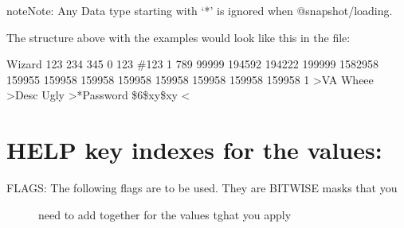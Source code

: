 \documentclass[letterpaper,10pt,english]{sphinxmanual}
\begin{document}
\begin{sphinxadmonition}{note}{Note:}
\sphinxAtStartPar
Any Data type starting with ‘*’ is ignored when @snapshot/loading.
\end{sphinxadmonition}

\sphinxAtStartPar
The structure above with the examples would look like this in the file:

Wizard
123
234
345
0
123
\#123
1
789
99999
194592
194222
199999
1582958
159955
159958
159958
159958
159958
159958
159958
159958
\sphinxhyphen{}1
\textgreater{}VA
Wheee
\textgreater{}Desc
Ugly
\textgreater{}*Password
\$6\$xy\$xy
\textless{}


\section{HELP key indexes for the values:}
\label{\detokenize{advanced:help-key-indexes-for-the-values}}\begin{description}
\item[{FLAGS: The following flags are to be used.  They are BITWISE masks that you}] \leavevmode
\sphinxAtStartPar
need to add together for the values tghat you apply

\end{description}
\end{document}
